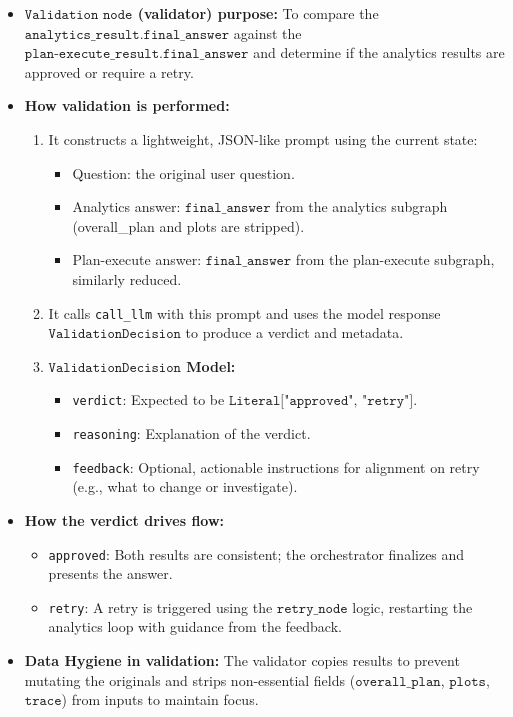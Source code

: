 \begin{itemize}[label=\textbullet]
  \item \textbf{$\texttt{Validation node}$ (validator) purpose:} To compare the
    $\texttt{analytics\_result.final\_answer}$ against the $\texttt{plan-execute\_result.final\_answer}$ and
    determine if the analytics results are approved or require a retry.
  \item \textbf{How validation is performed:}
    \begin{enumerate}[label=\arabic*.]
      \item It constructs a lightweight, JSON-like prompt using the current state:
        \begin{itemize}[label=$\circ$]
          \item Question: the original user question.
          \item Analytics answer: $\texttt{final\_answer}$ from the analytics subgraph (overall\_plan
            and plots are stripped).
          \item Plan-execute answer: $\texttt{final\_answer}$ from the plan-execute subgraph,
            similarly reduced.
        \end{itemize}
      \item It calls \texttt{call\_llm} with this prompt and uses the model response
        $\texttt{ValidationDecision}$ to produce a verdict and metadata.
      \item \textbf{$\texttt{ValidationDecision}$ Model:}
        \begin{itemize}[label=$\bullet$]
          \item \texttt{verdict}: Expected to be $\texttt{Literal["approved", "retry"]}$.
          \item \texttt{reasoning}: Explanation of the verdict.
          \item \texttt{feedback}: Optional, actionable instructions for alignment on retry (e.g.,
            what to change or investigate).
        \end{itemize}
    \end{enumerate}
  \item \textbf{How the verdict drives flow:}
    \begin{itemize}[label=\textbullet]
      \item \texttt{approved}: Both results are consistent; the orchestrator finalizes and presents
        the answer.
      \item \texttt{retry}: A retry is triggered using the $\texttt{retry\_node}$ logic, restarting the
        analytics loop with guidance from the feedback.
    \end{itemize}
  \item \textbf{Data Hygiene in validation:} The validator copies results to prevent mutating the
    originals and strips non-essential fields ($\texttt{overall\_plan}$, $\texttt{plots}$, $\texttt{trace}$)
    from inputs to maintain focus.
\end{itemize}
